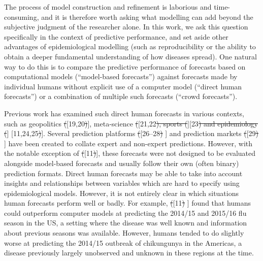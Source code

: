 \documentclass[10pt,letterpaper]{article} %
\providecommand{\DIFaddtex}[1]{{\protect\color{blue}\uwave{#1}}} %
\providecommand{\DIFdeltex}[1]{{\protect\color{red}\sout{#1}}}                      %
\providecommand{\DIFaddbegin}{} %
\providecommand{\DIFaddend}{} %
\providecommand{\DIFdelbegin}{} %
\providecommand{\DIFdelend}{} %
\providecommand{\DIFadd}[1]{\texorpdfstring{\DIFaddtex{#1}}{#1}} %
\providecommand{\DIFdel}[1]{\texorpdfstring{\DIFdeltex{#1}}{}} %
\newcommand{\DIFscaledelfig}{0.5}
\newlength{\DIFdelgraphicswidth} %
\newlength{\DIFdelgraphicsheight} %
\newcommand{\DIFaddincludegraphics}[2][]{{\color{blue}\fbox{\DIFOincludegraphics[#1]{#2}}}} %
\newcommand{\DIFdelincludegraphics}[2][]{%
\sbox{\DIFdelgraphicsbox}{\DIFOincludegraphics[#1]{#2}}%
\settoboxwidth{\DIFdelgraphicswidth}{\DIFdelgraphicsbox} %
\settoboxtotalheight{\DIFdelgraphicsheight}{\DIFdelgraphicsbox} %
\scalebox{\DIFscaledelfig}{%
\parbox[b]{\DIFdelgraphicswidth}{\usebox{\DIFdelgraphicsbox}\\[-\baselineskip] \rule{\DIFdelgraphicswidth}{0em}}\llap{\resizebox{\DIFdelgraphicswidth}{\DIFdelgraphicsheight}{%
\setlength{\unitlength}{\DIFdelgraphicswidth}%
\begin{picture}(1,1)%
\thicklines\linethickness{2pt} %
{\color[rgb]{1,0,0}\put(0,0){\framebox(1,1){}}}%
{\color[rgb]{1,0,0}\put(0,0){\line( 1,1){1}}}%
{\color[rgb]{1,0,0}\put(0,1){\line(1,-1){1}}}%
\end{picture}%
}\hspace*{3pt}}} %
} %
\DeclareRobustCommand{\DIFaddbegin}{\DIFOaddbegin \let\includegraphics\DIFaddincludegraphics} %
\DeclareRobustCommand{\DIFaddend}{\DIFOaddend \let\includegraphics\DIFOincludegraphics} %
\DeclareRobustCommand{\DIFdelbegin}{\DIFOdelbegin \let\includegraphics\DIFdelincludegraphics} %
\DeclareRobustCommand{\DIFdelend}{\DIFOaddend \let\includegraphics\DIFOincludegraphics} %
\begin{document}
The process of model construction and refinement is laborious and
time-consuming, and it is therefore worth asking what modelling can add
beyond the subjective judgment of the researcher alone. In this work, we
ask this question specifically in the context of predictive performance,
and set aside other advantages of epidemiological modelling (such as
reproducibility or the ability to obtain a deeper fundamental
understanding of how diseases spread). One natural way to do this is to
compare the predictive performance of forecasts based on computational
models (``model-based forecasts'') against forecasts made by individual
humans without explicit use of a computer model (``direct human
forecasts'') or a combination of multiple such forecasts (``crowd
forecasts'').

Previous work has examined such direct human forecasts in various
contexts, such as geopolitics \DIFdelbegin \DIFdel{(}\DIFdelend \DIFaddbegin {[}\DIFaddend 19,20\DIFdelbegin \DIFdel{)}\DIFdelend \DIFaddbegin {]}\DIFaddend , meta-science \DIFdelbegin \DIFdel{(}\DIFdelend \DIFaddbegin {[}\DIFaddend 21,22\DIFdelbegin \DIFdel{),
sports (}\DIFdelend \DIFaddbegin {]}\DIFadd{,
sports }{[}\DIFaddend 23\DIFdelbegin \DIFdel{) and epidemiology (}\DIFdelend \DIFaddbegin {]} \DIFadd{and epidemiology }{[}\DIFaddend 11,24,25\DIFdelbegin \DIFdel{)}\DIFdelend \DIFaddbegin {]}\DIFaddend . Several prediction
platforms \DIFdelbegin \DIFdel{(}\DIFdelend \DIFaddbegin {[}\DIFaddend 26--28\DIFdelbegin \DIFdel{) }\DIFdelend \DIFaddbegin {]} \DIFaddend and prediction markets \DIFdelbegin \DIFdel{(}\DIFdelend \DIFaddbegin {[}\DIFaddend 29\DIFdelbegin \DIFdel{) }\DIFdelend \DIFaddbegin {]} \DIFaddend have been created
to collate expert and non-expert predictions. However, with the notable
exception of \DIFdelbegin \DIFdel{(}\DIFdelend \DIFaddbegin {[}\DIFaddend 11\DIFdelbegin \DIFdel{)}\DIFdelend \DIFaddbegin {]}\DIFaddend , these forecasts were not designed to be evaluated
alongside model-based forecasts and usually follow their own (often
binary) prediction formats. Direct human forecasts may be able to take
into account insights and relationships between variables which are hard
to specify using epidemiological models. However, it is not entirely
clear in which situations human forecasts perform well or badly. For
example, \DIFdelbegin \DIFdel{(}\DIFdelend \DIFaddbegin {[}\DIFaddend 11\DIFdelbegin \DIFdel{) }\DIFdelend \DIFaddbegin {]} \DIFaddend found that humans could outperform computer models at
predicting the 2014/15 and 2015/16 flu season in the US, a setting where
the disease was well known and information about previous seasons was
available. However, humans tended to do slightly worse at predicting the
2014/15 outbreak of chikungunya in the Americas, a disease previously
largely unobserved and unknown in these regions at the time.
\end{document}
